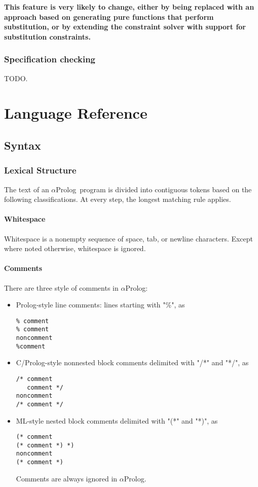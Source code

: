 \documentclass[draft,12pt]{report}
\newcommand{\aprolog}{$\alpha${Prolog}\xspace}
\begin{document}
\textbf{This feature is very likely to change, either by being replaced with an approach based on generating pure functions that perform substitution, or by extending the constraint solver with support for substitution constraints.  }






\section{Specification checking}

TODO.

\part{Language Reference}

\chapter{Syntax}
\section{Lexical Structure}

The text of an \aprolog\ program is divided into contiguous tokens
based on the following classifications.  At every step, the longest
matching rule applies.

\subsection{Whitespace}

Whitespace is a nonempty sequence of space, tab, or newline
characters.  Except where noted otherwise, whitespace is ignored.

\subsection{Comments}
There are three style of comments in \aprolog:
\begin{itemize}
\item Prolog-style line comments: lines starting with "\%", as
\begin{verbatim}
% comment
% comment
noncomment
%comment
\end{verbatim}
\item C/Prolog-style nonnested block comments delimited with "/*" and
  "*/", as
\begin{verbatim}
/* comment
   comment */
noncomment
/* comment */
\end{verbatim}
\item ML-style nested block comments delimited with "(*" and "*)", as
\begin{verbatim}
(* comment
(* comment *) *)
noncomment
(* comment *)
\end{verbatim}
  Comments are always ignored in \aprolog.
\end{itemize}
\end{document}
